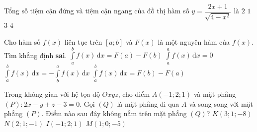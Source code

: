 	\begin{ex}%
	Tổng số tiệm cận đứng và tiệm cận ngang của đồ thị hàm số $y=\dfrac{2x+1}{\sqrt{4-x^2}}$ là
	\choice
	{\True $2$}
	{$1$}
	{$3$}
	{$4$}
\end{ex}
	\begin{ex}%
	Cho hàm số $f(x)$ liên tục trên $[a;b]$ và $F(x)$ là một nguyên hàm của $f(x)$. Tìm khẳng định \textbf{sai}.
	\choice
	{\True $\displaystyle\int\limits_a^b f(x)\mathrm{\,d}x=F(a)-F(b)$}
	{$\displaystyle\int\limits_a^a f(x)\mathrm{\,d}x=0$}
	{$\displaystyle\int\limits_a^b f(x)\mathrm{\,d}x=-\displaystyle\int\limits_b^a f(x)\mathrm{\,d}x$}
	{$\displaystyle\int\limits_a^b f(x)\mathrm{\,d}x=F(b)-F(a)$}
\end{ex}
\begin{ex}%
	Trong không gian với hệ tọa độ $ Oxyz$, cho điểm $A(-1;2;1)$ và mặt phẳng $(P): 2x-y+z-3=0$. Gọi $(Q)$ là mặt phẳng đi qua $A$ và song song với mặt phẳng $(P)$. Điểm nào sau đây không nằm trên mặt phẳng $(Q)$?
	\choice
	{$K(3;1;-8)$}
	{\True $N(2;1;-1)$}
	{$I(-1;2;1)$}
	{$M(1;0;-5)$}
	\end{ex}
